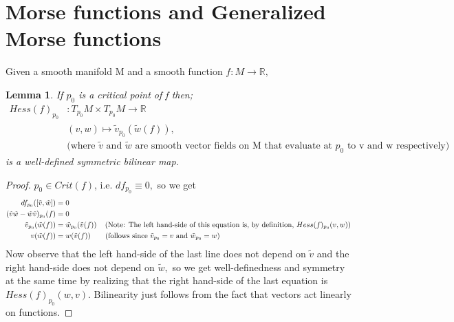 \documentclass{article}
\newtheorem{lemma}[theorem]{Lemma}
\newtheorem{proposed work}[theorem]{Proposed Work}
\begin{document}

\section{Morse functions and Generalized Morse functions}

Given a smooth manifold M and a smooth function $f\colon M \to \mathbb{R},$

\begin{lemma}
If $p_0$ is a critical point of f then;
 \begin{align*} 
Hess(f)_{p_0}&\colon T_{p_0}M\times T_{p_0}M\to \mathbb{R} \\
&(v,w)\mapsto \tilde{v}_{p_0}(\tilde{w}(f)), \\
&\text{(where $\tilde{v}$ and $\tilde{w}$ are smooth vector fields on M that evaluate at $p_0$ to v and w respectively)}
\end{align*}
is a well-defined symmetric bilinear map.
\end{lemma}
\begin{proof}


 $p_0\in Crit(f)$, i.e. $df_{p_0}\equiv 0,$ so we get 
\begin{align*}
df_{p_0}([\tilde{v},\tilde{w}])&=0\\
(\tilde{v}\tilde{w}-\tilde{w}\tilde{v})_{p_0}(f)&=0\\
\tilde{v}_{p_0}(\tilde{w}(f))&=\tilde{w}_{p_0}(\tilde{v}(f))\hspace{4mm} \text{(Note: The left hand-side of this equation is, by definition, $Hess(f)_{p_0}(v,w)$)}\\
v(\tilde{w}(f))&=w(\tilde{v}(f)) \hspace{7mm} (\text{follows since $\tilde{v}_{p_0}=v$ and $\tilde{w}_{p_0}=w$})
\end{align*}
Now observe that the left hand-side of the last line does not depend on $\tilde{v}$ and the right hand-side does not depend on $\tilde{w},$ so we get well-definedness and symmetry at the same time by realizing that the right hand-side of the last equation is $Hess(f)_{p_0}(w,v).$ Bilinearity just follows from the fact that vectors act linearly on functions. 
\end{proof}
\end{document}
